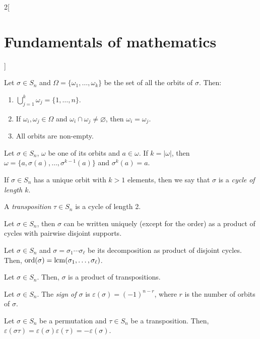\documentclass[../../../main.tex]{subfiles}
\begin{document}
\begin{multicols}{2}[\section{Fundamentals of mathematics}]
\begin{theorem}
    Let $\sigma\in S_n$ and $\Omega=\{\omega_1,\ldots,\omega_k\}$ be the set of all the orbits of $\sigma$. Then:
    \begin{enumerate}
        \item $\bigcup_{j=1}^k \omega_j=\{1,\ldots,n\}$.
        \item If $\omega_i,\omega_j\in\Omega$ and $\omega_i\cap\omega_j\ne\varnothing$, then $\omega_i=\omega_j$.
        \item All orbits are non-empty.
    \end{enumerate}
\end{theorem}
\begin{theorem}
    Let $\sigma\in S_n$, $\omega$ be one of its orbits and $a\in\omega$. If $k=|\omega|$, then $\omega=\{a,\sigma(a),\ldots,\sigma^{k-1}(a)\}$ and $\sigma^k(a)=a$.
\end{theorem}
\begin{definition}
    If $\sigma\in S_n$ has a unique orbit with $k>1$ elements, then we say that $\sigma$ is a \textit{cycle of length $k$}. 
\end{definition}
\begin{definition}
    A \textit{transposition} $\tau\in S_n$ is a cycle of length 2.
\end{definition}
\begin{theorem}
    Let $\sigma\in S_n$, then $\sigma$ can be written uniquely (except for the order) as a product of cycles with pairwise disjoint supports.
\end{theorem}
\begin{corollary}
    Let $\sigma\in S_n$ and $\sigma=\sigma_1\cdots\sigma_\ell$ be its decomposition as product of disjoint cycles. Then, $\text{ord}(\sigma)=\operatorname{lcm}(\sigma_1,\ldots,\sigma_\ell)$.
\end{corollary}
\begin{corollary}
    Let $\sigma\in S_n$. Then, $\sigma$ is a product of transpositions.
\end{corollary}
\begin{definition}
    Let $\sigma\in S_n$. The \textit{sign of $\sigma$} is $\varepsilon(\sigma)=(-1)^{n-r}$, where $r$ is the number of orbits of $\sigma$.
\end{definition}
\begin{theorem}
    Let $\sigma\in S_n$ be a permutation and $\tau\in S_n$ be a transposition. Then, $\varepsilon(\sigma\tau)=\varepsilon(\sigma)\varepsilon(\tau)=-\varepsilon(\sigma)$.

\end{theorem}
\end{multicols}
\end{document}
